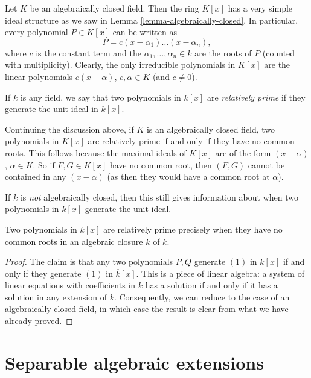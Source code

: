 \noindent
Let $K$ be an algebraically closed field. Then the ring $K[x]$ has a very
simple ideal structure as we saw in Lemma \ref{lemma-algebraically-closed}.
In particular, every polynomial $P \in K[x]$ can be written as
$$
P = c(x - \alpha_1) \ldots (x - \alpha_n),
$$
where $c$ is the constant term and the $\alpha_1, \ldots, \alpha_n \in k$
are the roots of $P$ (counted with multiplicity). Clearly, the only irreducible
polynomials in $K[x]$ are the linear polynomials $c(x - \alpha)$,
$c, \alpha \in K$ (and $c \neq 0$).

\begin{definition}
\label{definition-relatively-prime}
If $k$ is any field, we say that two polynomials in $k[x]$ are
{\it relatively prime} if they generate the unit ideal in $k[x]$.
\end{definition}

\noindent
Continuing the discussion above, if $K$ is an algebraically closed field,
two polynomials in $K[x]$ are relatively prime if and only if they have no
common roots. This follows because the maximal ideals of $K[x]$ are of the form
$(x - \alpha)$, $\alpha \in K$. So if $F, G \in K[x]$ have no common root,
then $(F, G)$ cannot be contained in any $(x - \alpha)$ (as then they would
have a common root at $\alpha$).

\medskip\noindent
If $k$ is {\it not} algebraically closed, then this still gives
information about when two polynomials in $k[x]$ generate the unit ideal.

\begin{lemma}
\label{lemma-relatively-prime-polynomials}
Two polynomials in $k[x]$ are relatively prime precisely when they
have no common roots in an algebraic closure $\overline{k}$ of $k$.
\end{lemma}

\begin{proof}
The claim is that any two polynomials $P, Q$ generate $(1)$ in $k[x]$ if and
only if they generate $(1)$ in $\overline{k}[x]$. This is a piece of
linear algebra: a system of linear equations with coefficients in $k$ has
a solution if and only if it has a solution in any extension of $k$.
Consequently, we can reduce to the case of an algebraically closed field, in
which case the result is clear from what we have already proved.
\end{proof}





\section{Separable algebraic extensions}
\label{section-separable-extensions}

